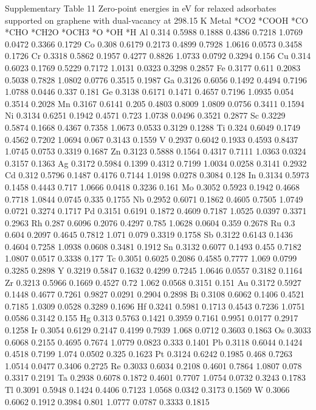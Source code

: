 Supplementary Table 11
Zero-point energies in eV for relaxed adsorbates supported on graphene with dual-vacancy at 298.15 K
Metal	*CO2	*COOH	*CO	*CHO	*CH2O	*OCH3	*O	*OH	*H
Al	0.314	0.5988	0.1888	0.4386	0.7218	1.0769	0.0472	0.3366	0.1729
Co	0.308	0.6179	0.2173	0.4899	0.7928	1.0616	0.0573	0.3458	0.1726
Cr	0.3318	0.5862	0.1957	0.4277	0.8826	1.0733	0.0792	0.3294	0.156
Cu	0.314	0.6023	0.1769	0.5229	0.7172	1.0131	0.0323	0.3298	0.2857
Fe	0.3177	0.611	0.2083	0.5038	0.7828	1.0802	0.0776	0.3515	0.1987
Ga	0.3126	0.6056	0.1492	0.4494	0.7196	1.0788	0.0446	0.337	0.181
Ge	0.3138	0.6171	0.1471	0.4657	0.7196	1.0935	0.054	0.3514	0.2028
Mn	0.3167	0.6141	0.205	0.4803	0.8009	1.0809	0.0756	0.3411	0.1594
Ni	0.3134	0.6251	0.1942	0.4571	0.723	1.0738	0.0496	0.3521	0.2877
Sc	0.3229	0.5874	0.1668	0.4367	0.7358	1.0673	0.0533	0.3129	0.1288
Ti	0.324	0.6049	0.1749	0.4562	0.7202	1.0694	0.067	0.3143	0.1559
V	0.2937	0.6042	0.1933	0.4593	0.8437	1.0745	0.0753	0.3319	0.1687
Zn	0.3123	0.5888	0.1564	0.4317	0.7111	1.0363	0.0324	0.3157	0.1363
Ag	0.3172	0.5984	0.1399	0.4312	0.7199	1.0034	0.0258	0.3141	0.2932
Cd	0.312	0.5796	0.1487	0.4176	0.7144	1.0198	0.0278	0.3084	0.128
In	0.3134	0.5973	0.1458	0.4443	0.717	1.0666	0.0418	0.3236	0.161
Mo	0.3052	0.5923	0.1942	0.4668	0.7718	1.0844	0.0745	0.335	0.1755
Nb	0.2952	0.6071	0.1862	0.4605	0.7505	1.0749	0.0721	0.3274	0.1717
Pd	0.3151	0.6191	0.1872	0.4609	0.7187	1.0525	0.0397	0.3371	0.2963
Rh	0.287	0.6096	0.2076	0.4297	0.785	1.0628	0.0604	0.359	0.2678
Ru	0.3		0.604	0.2097	0.4645	0.7812	1.071	0.079	0.3319	0.1758
Sb	0.3122	0.6143	0.1436	0.4604	0.7258	1.0938	0.0608	0.3481	0.1912
Sn	0.3132	0.6077	0.1493	0.455	0.7182	1.0807	0.0517	0.3338	0.177
Tc	0.3051	0.6025	0.2086	0.4585	0.7777	1.069	0.0799	0.3285	0.2898
Y	0.3219	0.5847	0.1632	0.4299	0.7245	1.0646	0.0557	0.3182	0.1164
Zr	0.3213	0.5966	0.1669	0.4527	0.72	1.062	0.0568	0.3151	0.151
Au	0.3172	0.5927	0.1448	0.4677	0.7261	0.9827	0.0291	0.2904	0.2898
Bi	0.3108	0.6062	0.1406	0.4521	0.7185	1.0309	0.0528	0.3289	0.1696
Hf	0.3241	0.5981	0.1713	0.4543	0.7236	1.0751	0.0586	0.3142	0.155
Hg	0.313	0.5763	0.1421	0.3959	0.7161	0.9951	0.0177	0.2917	0.1258
Ir	0.3054	0.6129	0.2147	0.4199	0.7939	1.068	0.0712	0.3603	0.1863
Os	0.3033	0.6068	0.2155	0.4695	0.7674	1.0779	0.0823	0.333	0.1401
Pb	0.3118	0.6044	0.1424	0.4518	0.7199	1.074	0.0502	0.325	0.1623
Pt	0.3124	0.6242	0.1985	0.468	0.7263	1.0514	0.0477	0.3406	0.2725
Re	0.3033	0.6034	0.2108	0.4601	0.7864	1.0807	0.078	0.3317	0.2191
Ta	0.2938	0.6078	0.1872	0.4601	0.7707	1.0754	0.0732	0.3243	0.1783
Tl	0.3091	0.5948	0.1424	0.4406	0.7123	1.0568	0.0342	0.3173	0.1569
W	0.3066	0.6062	0.1912	0.3984	0.801	1.0777	0.0787	0.3333	0.1815


